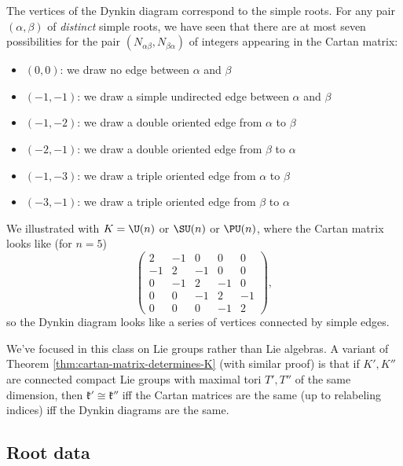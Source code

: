 \documentclass[reqno]{amsart} 
\begin{document}
The vertices of the Dynkin diagram correspond to the simple roots.  For any pair $(\alpha,\beta)$ of \emph{distinct} simple roots, we have seen that there are at most seven possibilities for the pair $(N_{\alpha \beta}, N_{\beta \alpha})$ of integers appearing in the Cartan matrix:
\begin{itemize}
\item $(0,0)$: we draw no edge between $\alpha$ and $\beta$
\item $(-1,-1)$: we draw a simple undirected edge between $\alpha$ and $\beta$
\item $(-1,-2)$: we draw a double oriented edge from $\alpha$ to $\beta$
\item $(-2,-1)$: we draw a double oriented edge from $\beta$ to $\alpha$
\item $(-1,-3)$: we draw a triple oriented edge from $\alpha$ to $\beta$
\item $(-3,-1)$: we draw a triple oriented edge from $\beta$ to $\alpha$
\end{itemize}
We illustrated with $K = \U(n)$ or $\SU(n)$ or $\PU(n)$, where the Cartan matrix looks like (for $n=5$)
\begin{equation*}
  \begin{pmatrix}
    2 & -1 & 0 & 0 & 0  \\
    -1 & 2 & -1 & 0 & 0 \\
    0 & -1  & 2 & -1 & 0 \\
    0 & 0 & -1  & 2 & -1 \\
    0 & 0 & 0 & -1 & 2
  \end{pmatrix}
,
\end{equation*}
so the Dynkin diagram looks like a series of vertices connected by simple edges.

We've focused in this class on Lie groups rather than Lie algebras.  A variant of Theorem \ref{thm:cartan-matrix-determines-K} (with similar proof) is that if $K', K''$ are connected compact Lie groups with maximal tori $T', T''$ of the same dimension, then $\mathfrak{k} ' \cong \mathfrak{k} ''$ iff the Cartan matrices are the same (up to relabeling indices) iff the Dynkin diagrams are the same.

\subsection{Root data}\label{sec:root-data}
\end{document}
